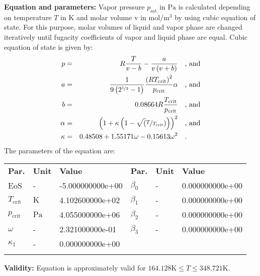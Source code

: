 \textbf{Equation and parameters:}
\newline
%
Vapor pressure $p_\mathrm{sat}$ in $\si{\pascal}$ is calculated depending on temperature $T$ in $\si{\kelvin}$ and molar volume v in $\si{\mole\per\cubic\meter}$ by using cubic equation of state. For this purpose, molar volumes of liquid and vapor phase are changed iteratively until fugacity coefficients of vapor and liquid phase are equal. Cubic equation of state is given by:
\begin{equation*}
\begin{split}
p &=& R \frac{T}{v - b} - \frac{a}{v \left(v + b\right)} & \quad\text{, and} \\
a &=& \frac{1}{9 \left(2^{\nicefrac{1}{3}} - 1\right)} \frac{\left(R T_\mathrm{crit} \right)^2}{p_\mathrm{crit}} \alpha & \quad\text{, and} \\
b &=& 0.08664 R \frac{T_\mathrm{crit}}{p_\mathrm{crit}} & \quad\text{, and} \\
\alpha &=& \left(1 + \kappa \left(1 - \sqrt(\nicefrac{T}{T_\mathrm{crit}}) \right) \right)^2 & \quad\text{, and} \\
\kappa &=& 0.48508 + 1.55171 \omega - 0.15613 \omega^2 & \quad\text{.}
\end{split}
\end{equation*}
%
The parameters of the equation are:
%
\begin{longtable}[l]{lll|lll}
\toprule
\addlinespace
\textbf{Par.} & \textbf{Unit} & \textbf{Value} &	\textbf{Par.} & \textbf{Unit} & \textbf{Value} \\
\addlinespace
\midrule
\endhead

\bottomrule
\endfoot
\bottomrule
\endlastfoot
\addlinespace

EoS & - & -5.000000000e+00 & $\beta_0$ & - & 0.000000000e+00 \\
$T_\mathrm{crit}$ & $\si{\kelvin}$ & 4.102600000e+02 & $\beta_1$ & - & 0.000000000e+00 \\
$p_\mathrm{crit}$ & $\si{\pascal}$ & 4.055000000e+06 & $\beta_2$ & - & 0.000000000e+00 \\
$\omega$ & - & 2.321000000e-01 & $\beta_3$ & - & 0.000000000e+00 \\
$\kappa_1$ & - & 0.000000000e+00 & & & \\

\addlinespace\end{longtable}

\textbf{Validity:}
\newline
Equation is approximately valid for $164.128 \si{\kelvin} \leq T \leq 348.721 \si{\kelvin}$.
\newline

